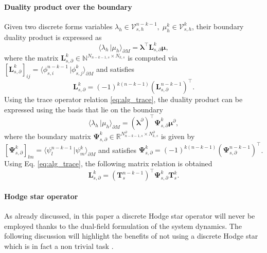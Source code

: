 \documentclass{elsarticle}
\newcommand{\dualpr}[3][]{\ensuremath{\langle #2 \, \vert #3 \rangle_{#1}}}
\begin{document}
\paragraph{Duality product over the boundary}
Given two discrete forms variables $\lambda_h \in \mathcal{V}_{s, h}^{n-k-1}, \; \mu_h^k \in \mathcal{V}_{s, h}^{k}$, their boundary duality product is expressed as
\begin{equation}\label{eq:alg_dualpr_bd}
    \dualpr[\partial M]{\lambda_h}{\mu_h} = \bm{\lambda}^\top \mathbf{L}^k_{s, \partial} \bm{\mu},
\end{equation}
where the matrix $\mathbf{L}^k_{s, \partial} \in \mathbb{N}^{N_{n-k-1, s}\times N_{k, s}}$ is computed via $[\mathbf{L}^k_{s, \partial}]_{ij} = \dualpr[\partial M]{\phi_{s, i}^{n-k-1}}{\phi_{s, j}^k}$ and satisfies
\begin{equation}
    \mathbf{L}^k_{s, \partial} = (-1)^{k(n-k-1)} (\mathbf{L}^{n-k-1}_{s, \partial})^\top.
\end{equation}
Using the trace operator relation \eqref{eq:alg_trace}, the duality product can be expressed using the basis that lie on the boundary
\begin{equation}
\label{eq:alg_wedge_bd}
    \dualpr[\partial M]{\lambda_h}{\mu_h} = (\bm{\lambda}^\partial)^\top \mathbf{\Psi}^k_{s, \partial} \bm{\mu}^\partial,
\end{equation}
where the boundary matrix $\mathbf{\Psi}^k_{s, \partial} \in \mathbb{R}^{N_{n-k-1, s}^\partial \times N_{k, s}^\partial}$ is given by $[\mathbf{\Psi}^k_{s, \partial}]_{lm} = \dualpr[\partial M]{\psi^{n-k-1}_l}{\psi^k_m}$ and satisfies $\mathbf{\Psi}^k_{s, \partial} = (-1)^{k(n-k-1)}(\mathbf{\Psi}^{n-k-1}_{s, \partial})^\top$. Using Eq. \eqref{eq:alg_trace}, the following matrix relation is obtained
\begin{equation}
    \mathbf{L}^k_{s, \partial} = (\mathbf{T}^{n-k-1}_s)^\top \mathbf{\Psi}^k_{s, \partial} \mathbf{T}^k_s.
\end{equation}

\paragraph{Hodge star operator}
As already discussed, in this paper a discrete Hodge star operator will never be employed thanks to the dual-field formulation of the system dynamics. The following discussion will highlight the benefits of not using a discrete Hodge star which is in fact a non trivial task \cite{hiptmair2001}.
\end{document}
